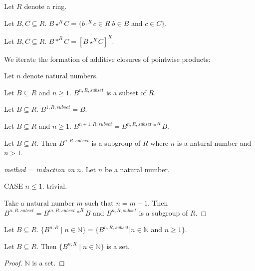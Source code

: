 \documentclass[11pt]{article}
\newcommand{\Powers}[2]{\{{#1}^{n,#2} \mid n \in \mathbb{N}\}}
\begin{document}
\begin{forthel}

Let $R$ denote a ring.

\begin{definition}
Let $B,C \subseteq R$.
$B \star^{R} C = \{b \cdot^{R} c \in R | b \in B$ and $c \in C\}$.
\end{definition} 

\begin{definition}
Let $B,C \subseteq R$. 
$B \ast^{R} C = [B \star^{R} C]^{R}$.
\end{definition}

\end{forthel}
We iterate the formation of additive closures of pointwise products:
\begin{forthel}

Let $n$ denote natural numbers.

\begin{signature}
Let $B \subseteq R$ and $n \geq 1$.
$B^{n,R,subset}$ is a subset of $R$.
\end{signature}

\begin{axiom}
Let $B \subseteq R$. $B^{1,R,subset} = B$.
\end{axiom}

\begin{axiom}
Let $B \subseteq R$ and $n \geq 1$.
$B^{n+1,R,subset} = B^{n,R,subset} \ast^{R} B$. 
\end{axiom}

\begin{lemma}
Let $B \subseteq R$. Then
$B^{n,R,subset}$ is a subgroup of $R$ 
where $n$ is a natural number and $n > 1$.
\end{lemma}
\begin{proof}[method = induction on $n$]

Let $n$ be a natural number.

CASE $n \leq 1$. trivial.

Take a natural number $m$ such that $n = m + 1$.
Then $B^{n,R,subset} = B^{m,R,subset} \ast^{R} B$ and
$B^{n,R,subset}$ is a subgroup of $R$.
\end{proof}


\begin{definition} Let $B \subseteq R$.
$\Powers{B}{R} = \{B^{n,R,subset} | n \in \mathbb{N}$ and $n \geq 1\} $.
\end{definition}

\begin{lemma}
Let $B \subseteq R$. Then $\Powers{B}{R}$ is a set.
\end{lemma}
\begin{proof} $\mathbb{N}$ is a set.
\end{proof}

\end{forthel}
\end{document}
